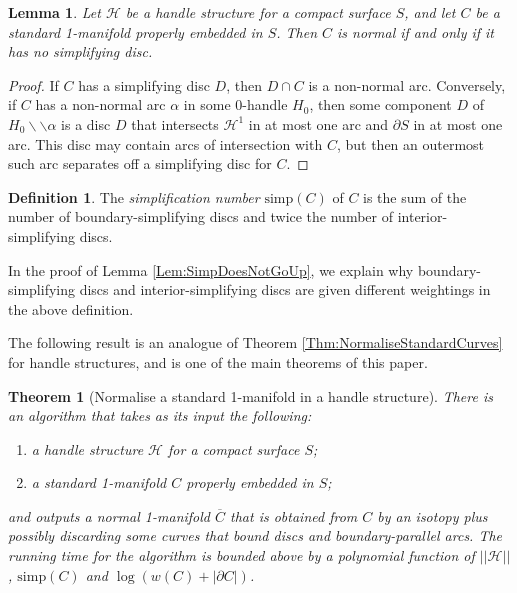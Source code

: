 \documentclass[oneside]{amsart}
\numberwithin{equation}{section}
\theoremstyle{plain}
\newtheorem{theorem}[equation]{Theorem}
\newtheorem{lemma}[equation]{Lemma}
\theoremstyle{definition}
\newtheorem{definition}[equation]{Definition}
\newcommand{\cut}{\backslash\backslash}
\newcommand{\calH}{\mathcal{H}}
\begin{document}
\begin{lemma}
\label{Lem:NormalNoSimplifying}
Let $\calH$ be a handle structure for a compact surface $S$, and let $C$ be a standard 1-manifold properly embedded in $S$. Then $C$ is normal if and only if it has no simplifying disc.
\end{lemma}

\begin{proof} If $C$ has a simplifying disc $D$, then $D \cap C$ is a non-normal arc. Conversely, if $C$ has a non-normal arc $\alpha$ in some 0-handle $H_0$, then some component $D$ of $H_0 \cut \alpha$ is a disc $D$ that intersects $\calH^1$ in at most one arc and $\partial S$ in at most one arc. This disc may contain arcs of intersection with $C$, but then an outermost such arc separates off a simplifying disc for $C$.
\end{proof}


\begin{definition}
\label{Def:SimpNumber}
The \emph{simplification number} $\mathrm{simp}(C)$ of $C$ is the sum of the number of boundary-simplifying discs and twice the number of interior-simplifying discs.
\end{definition}

In the proof of Lemma \ref{Lem:SimpDoesNotGoUp}, we explain why boundary-simplifying discs and interior-simplifying discs are given different weightings in the above definition.

The following result is an analogue of Theorem \ref{Thm:NormaliseStandardCurves} for handle structures, and is one of the main theorems of this paper.

\begin{theorem}[{\sc Normalise a standard 1-manifold in a handle structure}]
\label{Thm:Normalise1Manifold}
There is an algorithm that takes as its input the following:
\begin{enumerate}
\item a handle structure $\calH$ for a compact surface $S$;
\item a standard 1-manifold $C$ properly embedded in $S$;
\end{enumerate}
and outputs a normal 1-manifold $\overline{C}$ that is obtained from $C$ by an isotopy plus possibly discarding some curves that bound discs and boundary-parallel arcs. The running time for the algorithm is bounded above by a polynomial function of $||\calH||$, $\mathrm{simp}(C)$ and $\log (w(C) + |\partial C|)$.
\end{theorem}
\end{document}
